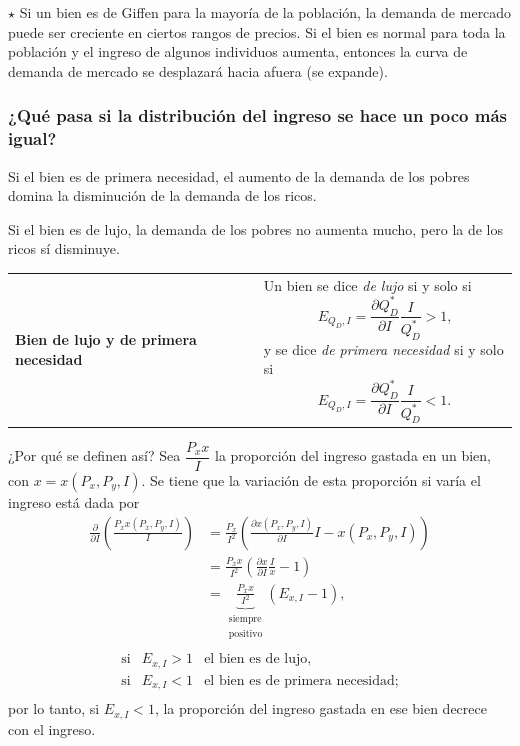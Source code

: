 \documentclass{report}
\newenvironment{obs}{$\star$ }{}
\newenvironment{definition}[1]{\begin{center}
\begin{tabular}{p{3.5cm} p{12.5cm}}
\textbf{#1} &
}
{\\ \end{tabular}\end{center}}
\begin{document}
\begin{obs}
Si un bien es de Giffen para la mayoría de la población, la demanda de mercado puede ser creciente en ciertos rangos de precios. Si el bien es normal para toda la población y el ingreso de algunos individuos aumenta, entonces la curva de demanda de mercado se desplazará hacia afuera (se expande).
\end{obs}

\subsubsection{¿Qué pasa si la distribución del ingreso se hace un poco más igual?}

Si el bien es de primera necesidad, el aumento de la demanda de los pobres domina la disminución de la demanda de los ricos.

Si el bien es de lujo, la demanda de los pobres no aumenta mucho, pero la de los ricos sí disminuye.

\begin{definition}{Bien de lujo y de primera necesidad}
Un bien se dice \textit{de lujo} si y solo si
$$E_{Q_D,I}=\frac{\partial Q_D^*}{\partial I}\frac{I}{Q_D^*}>1\text{,}$$
y se dice \textit{de primera necesidad} si y solo si
$$E_{Q_D,I}=\frac{\partial Q_D^*}{\partial I}\frac{I}{Q_D^*}<1\text{.}$$
\end{definition}

¿Por qué se definen así? Sea $\dfrac{P_xx}{I}$ la proporción del ingreso gastada en un bien, con $x=x\!\left(P_x,P_y,I\right)$. Se tiene que la variación de esta proporción si varía el ingreso está dada por
$$\begin{align}
\frac{\partial}{\partial I}\left(\frac{P_xx\!\left(P_x,P_y,I\right)}{I}\right)&=\frac{P_x}{I^2}\left(\frac{\partial x\!\left(P_x,P_y,I\right)}{\partial I}I-x\!\left(P_x,P_y,I\right)\right)\\
{}&=\frac{P_xx}{I^2}\left(\frac{\partial x}{\partial I}\frac{I}{x}-1\right)\\
{}&=\underbrace{\frac{P_xx}{I^2}}_{\mathrm{
\begin{smallmatrix}
\text{siempre}\\
\text{positivo}
\end{smallmatrix}
}}\left(E_{x,I}-1\right)\text{,}\\
\end{align}$$
$$
\begin{matrix}
\text{si} & E_{x,I} > 1 & \text{el bien es de lujo,} \\
\text{si} & E_{x,I} < 1 & \text{el bien es de primera necesidad;}\\
\end{matrix}
$$
por lo tanto, si $E_{x,I} < 1$, la proporción del ingreso gastada en ese bien decrece con el ingreso.
\end{document}
